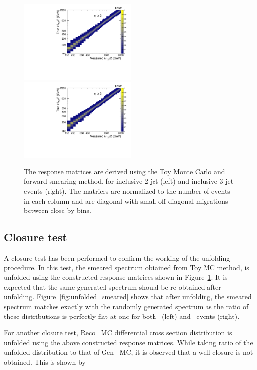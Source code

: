 \begin{figure}[!htbp]
 \begin{center}
 \includegraphics[width=0.51\textwidth]{Plots_HT_2_150/Normalized_Response_Matrix_NLO_2_range_column.pdf}%
 ~~\includegraphics[width=0.51\textwidth]{Plots_HT_2_150/Normalized_Response_Matrix_NLO_3_column.pdf} 
 \caption{The response matrices are derived using the Toy Monte Carlo and forward smearing method, for inclusive 2-jet (left) and inclusive 3-jet events (right). The matrices are normalized to the number of events in each column and are diagonal with small off-diagonal migrations between close-by \httwo bins.}
 \label{fig:response_NLO}
 \end{center}
\end{figure}

\subsection{Closure test}
A closure test has been performed to confirm the working of the unfolding procedure. In this test, the smeared spectrum obtained from Toy MC method, is unfolded using the constructed response matrices shown in Figure~\ref{fig:response_NLO}. It is expected that the same generated spectrum should be re-obtained after unfolding. Figure~\ref{fig:unfolded_smeared} shows that after unfolding, the smeared spectrum matches exactly with the randomly generated spectrum as the ratio of these distributions is perfectly flat at one for both \njt~(left) and \njth~events (right).

For another closure test, Reco \MGP~MC differential cross section distribution is unfolded using the above constructed response matrices. While taking ratio of the unfolded distribution to that of Gen \MGP~MC, it is observed that a well closure is not obtained. This is shown by 

